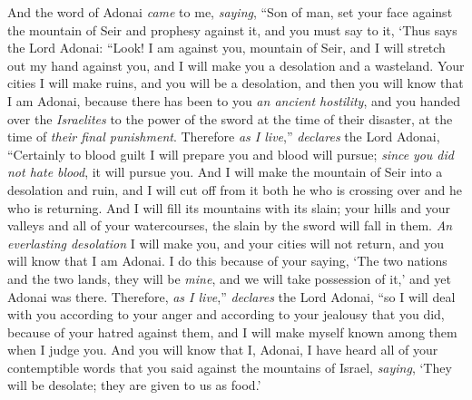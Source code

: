 \begin{biblechapter} %
 And the word of Adonai \textit{came} to me, \textit{saying},
\verse “Son of man, set your face against the mountain of Seir and prophesy against it,
\verse and you must say to it, ‘Thus says the Lord Adonai: “Look! I am against you, mountain of Seir, and I will stretch out my hand against you, and I will make you a desolation and a wasteland.
\verse Your cities I will make ruins, and you will be a desolation, and then you will know that I am Adonai,
\verse because there has been to you \textit{an ancient hostility}, and you handed over the \textit{Israelites} to the power of the sword at the time of their disaster, at the time of \textit{their final punishment}.
\verse Therefore \textit{as I live},” \textit{declares} the Lord Adonai, “Certainly to blood guilt I will prepare you and blood will pursue; \textit{since} \textit{you did not hate blood}, it will pursue you.
\verse And I will make the mountain of Seir into a desolation and ruin, and I will cut off from it both he who is crossing over and he who is returning.
\verse And I will fill its mountains with its slain; your hills and your valleys and all of your watercourses, the slain by the sword will fall in them.
\verse \textit{An everlasting desolation} I will make you, and your cities will not return, and you will know that I am Adonai.
\verse I do this because of your saying, ‘The two nations and the two lands, they will be \textit{mine}, and we will take possession of it,’ and yet Adonai was there.
\verse Therefore, \textit{as I live},” \textit{declares} the Lord Adonai, “so I will deal with you according to your anger and according to your jealousy that you did, because of your hatred against them, and I will make myself known among them when I judge you.
\verse And you will know that I, Adonai, I have heard all of your contemptible words that you said against the mountains of Israel, \textit{saying}, ‘They will be desolate; they are given to us as food.’

\end{biblechapter}
